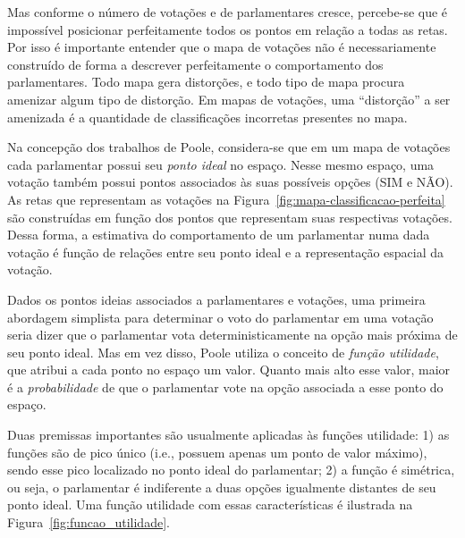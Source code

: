 \documentclass[a4paper, 12pt]{article}
\newcommand\nay{NÃO\xspace}
\newcommand\yea{SIM\xspace}
\begin{document}
Mas conforme o número de votações e de parlamentares cresce, percebe-se que é impossível posicionar perfeitamente todos os pontos em relação a todas as retas. Por isso é importante entender que o mapa de votações não é necessariamente construído de forma a descrever perfeitamente o comportamento dos parlamentares. Todo mapa gera distorções, e todo tipo de mapa procura amenizar algum tipo de distorção. Em mapas de votações, uma ``distorção'' a ser amenizada é a quantidade de classificações incorretas presentes no mapa.

Na concepção dos trabalhos de Poole, considera-se que em um mapa de votações cada parlamentar possui seu \emph{ponto ideal} no espaço. Nesse mesmo espaço, uma votação também possui pontos associados às suas possíveis opções (\yea e \nay). As retas que representam as votações na Figura~\ref{fig:mapa-classificacao-perfeita} são construídas em função dos pontos que representam suas respectivas votações. Dessa forma, a estimativa do comportamento de um parlamentar numa dada votação é função de relações entre seu ponto ideal e a representação espacial da votação. 

Dados os pontos ideias associados a parlamentares e votações, uma primeira abordagem simplista para determinar o voto do parlamentar em uma votação seria dizer que o parlamentar vota deterministicamente na opção mais próxima de seu ponto ideal. Mas em vez disso, Poole utiliza o conceito de \emph{função utilidade}, que atribui a cada ponto no espaço um valor. Quanto mais alto esse valor, maior é a \emph{probabilidade} de que o parlamentar vote na opção associada a esse ponto do espaço. 

Duas premissas importantes são usualmente aplicadas às funções utilidade: 1) as funções são de pico único (i.e., possuem apenas um ponto de valor máximo), sendo esse pico localizado no ponto ideal do parlamentar; 2) a função é simétrica, ou seja, o parlamentar é indiferente a duas opções igualmente distantes de seu ponto ideal. Uma função utilidade com essas características é ilustrada na Figura~\ref{fig:funcao_utilidade}.
\end{document}
